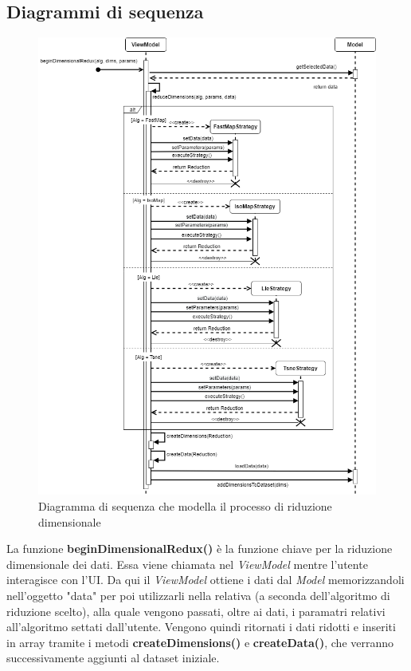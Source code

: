 \subsection{Diagrammi di sequenza}
\begin{figure}[hb]
\includegraphics[width=12cm]{Images/Allegato Tecnico-Sequenza-DR}
\centering
\caption{Diagramma di sequenza che modella il processo di riduzione dimensionale}
\end{figure}
La funzione \textbf{beginDimensionalRedux()} è la funzione chiave per la riduzione dimensionale dei dati. Essa viene chiamata nel \textit{ViewModel} mentre l'utente interagisce con l'UI. Da qui il \textit{ViewModel} ottiene i dati dal \textit{Model} memorizzandoli nell'oggetto "data" per poi utilizzarli nella relativa  (a seconda dell'algoritmo di riduzione scelto), alla quale vengono passati, oltre ai dati, i paramatri relativi all'algoritmo settati dall'utente.
Vengono quindi ritornati i dati ridotti e inseriti in array tramite i metodi \textbf{createDimensions()} e \textbf{createData()}, che verranno successivamente aggiunti al dataset iniziale.
\newpage
